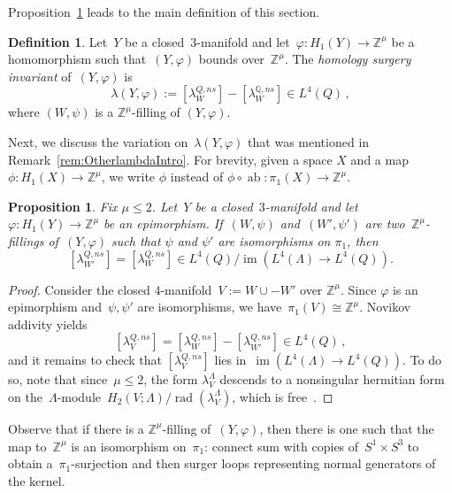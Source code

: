 \documentclass[10.9pt,a4paper]{amsart}
\newtheorem{proposition}[theorem]{Proposition}
\theoremstyle{definition}
\newtheorem{definition}[theorem]{Definition}
\theoremstyle{remark}
\newcommand{\Z}{\mathbb{Z}}
\newcommand{\Q}{\mathbb{Q}}
\newcommand{\im}{\operatorname{im}}
\begin{document}
Proposition~\ref{prop:WellDef} leads to the main definition of this section.

\begin{definition}
\label{def:WittInvariant3Manifold}
Let~$Y$ be a closed~$3$-manifold and let~$\varphi \colon H_1(Y) \to \Z^\mu$ be a homomorphism such that~$(Y,\varphi)$ bounds over~$\Z^\mu$.
The \emph{homology surgery invariant} of~$(Y,\varphi)$ is 
$$ 
\lambda(Y,\varphi):=[\lambda_W^{Q,\textit{ns}}]-[\lambda_W^{\Q,\textit{ns}}] \in L^4(Q)\,,
$$
where $(W,\psi)$ is a $\Z^\mu$-filling of $(Y,\varphi)$.
\end{definition}


Next,  we discuss the variation on~$\lambda(Y,\varphi)$ that was mentioned in Remark~\ref{rem:OtherlambdaIntro}.
For brevity, given a space $X$ and a map $\phi \colon H_1(X) \to \Z^\mu$, we write $\phi$ instead of $\phi \circ \operatorname{ab} \colon \pi_1(X) \to \Z^\mu$.


\begin{proposition}
\label{prop:WellDef}
Fix $\mu \leq 2$.
Let~$Y$ be a closed~$3$-manifold and let~$\varphi \colon H_1(Y) \to \Z^\mu$ be an epimorphism.
If~$(W,\psi)$ and~$(W',\psi')$ are two~$\Z^\mu$-fillings of~$(Y,\varphi)$ such that $\psi$ and $\psi'$ are isomorphisms on $\pi_1$, then 
$$ 
[\lambda_{W'}^{Q,\textit{ns}}]
=
[\lambda_W^{Q,\textit{ns}}]
\in L^4(Q)/\im(L^4(\Lambda) \to L^4(Q)).
$$
\end{proposition}
\begin{proof}
Consider the closed $4$-manifold~$V:=W \cup -W'$ over $\Z^\mu$.
Since $\varphi$ is an epimorphism and~$\psi,\psi'$ are isomorphisms,  we have~$\pi_1(V) \cong \Z^\mu$.
Novikov addivity yields
$$ [\lambda_V^{Q,\textit{ns}}]=[\lambda_{W}^{Q,\textit{ns}}]-[\lambda_{W'}^{Q,\textit{ns}}] \in L^4(Q)\,,$$
and it remains to check that $[\lambda_V^{Q,\textit{ns}}]$ lies in~$\im(L^4(\Lambda) \to L^4(Q))$. 
To do so,  note that since~$\mu \leq 2$,  the form $\lambda_V^\Lambda$ descends to a nonsingular hermitian form on the~$\Lambda$-module~$H_2(V;\Lambda)/\operatorname{rad}(\lambda_V^\Lambda)$, which is free~\cite[Theorem~B]{HambletonKreckTeichner}.
\end{proof}

Observe that if there is a $\Z^\mu$-filling of~$(Y,\varphi)$, then there is one such that the map to~$\Z^\mu$ is an isomorphism on~$\pi_1$: connect sum with copies of~$S^1 \times S^3$ to obtain a~$\pi_1$-surjection and then surger loops representing normal generators of the kernel.
\end{document}
